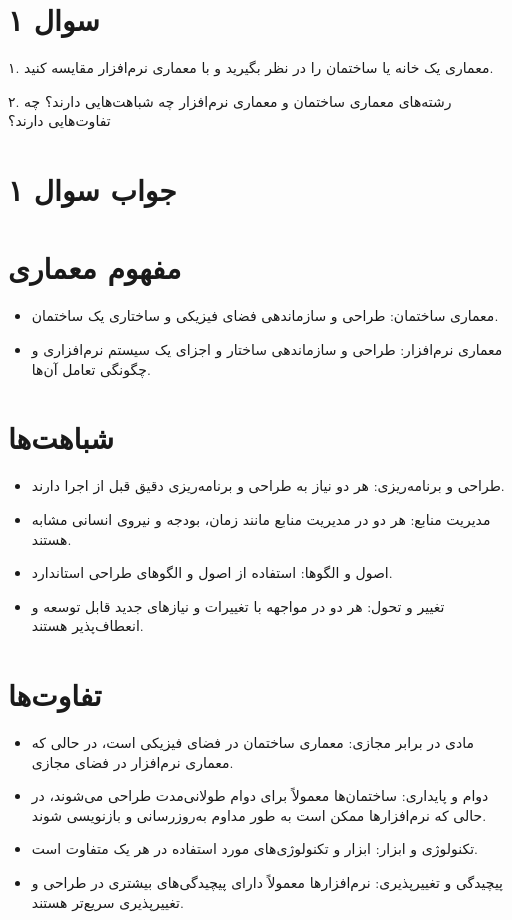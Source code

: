 \section*{سوال ۱}

۱. معماری یک خانه یا ساختمان را در نظر بگیرید و با معماری نرم‌افزار مقایسه کنید.

۲. رشته‌های معماری ساختمان و معماری نرم‌افزار چه شباهت‌هایی دارند؟ چه تفاوت‌هایی دارند؟

\section*{جواب سوال ۱}

\section*{مفهوم معماری}
\begin{itemize}
	\item معماری ساختمان: طراحی و سازماندهی فضای فیزیکی و ساختاری یک ساختمان.
	\item معماری نرم‌افزار: طراحی و سازماندهی ساختار و اجزای یک سیستم نرم‌افزاری و چگونگی تعامل آن‌ها.
\end{itemize}

\section*{شباهت‌ها}
\begin{itemize}
	\item طراحی و برنامه‌ریزی: هر دو نیاز به طراحی و برنامه‌ریزی دقیق قبل از اجرا دارند.
	\item مدیریت منابع: هر دو در مدیریت منابع مانند زمان، بودجه و نیروی انسانی مشابه هستند.
	\item اصول و الگوها: استفاده از اصول و الگوهای طراحی استاندارد.
	\item تغییر و تحول: هر دو در مواجهه با تغییرات و نیازهای جدید قابل توسعه و انعطاف‌پذیر هستند.
\end{itemize}

\section*{تفاوت‌ها}
\begin{itemize}
	\item مادی در برابر مجازی: معماری ساختمان در فضای فیزیکی است، در حالی که معماری نرم‌افزار در فضای مجازی.
	\item دوام و پایداری: ساختمان‌ها معمولاً برای دوام طولانی‌مدت طراحی می‌شوند، در حالی که نرم‌افزارها ممکن است به طور مداوم به‌روزرسانی و بازنویسی شوند.
	\item تکنولوژی و ابزار: ابزار و تکنولوژی‌های مورد استفاده در هر یک متفاوت است.
	\item پیچیدگی و تغییرپذیری: نرم‌افزارها معمولاً دارای پیچیدگی‌های بیشتری در طراحی و تغییرپذیری سریع‌تر هستند.
\end{itemize}